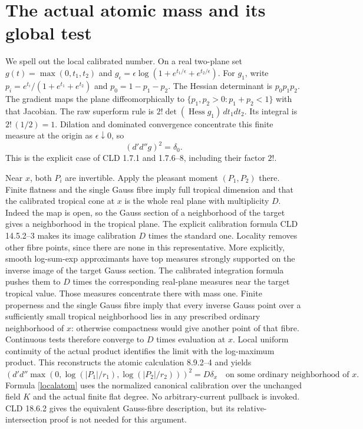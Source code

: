 \documentclass[11pt]{article}
\newcommand{\DD}{d'd''}
\theoremstyle{remark}\newtheorem{remark}[theorem]{Remark}
\begin{document}
\section{The actual atomic mass and its global test}
We spell out the local calibrated number.
On a real two-plane set $g(t)=\max(0,t_1,t_2)$ and
$g_\epsilon=\epsilon\log(1+e^{t_1/\epsilon}+e^{t_2/\epsilon})$.
For $g_1$, write $p_i=e^{t_i}/(1+e^{t_1}+e^{t_2})$ and
$p_0=1-p_1-p_2$. The Hessian determinant is $p_0p_1p_2$.
The gradient maps the plane diffeomorphically to
$\{p_1,p_2>0:p_1+p_2<1\}$ with that Jacobian.
The raw superform rule is $2!\det(\operatorname{Hess}g_1)\,dt_1dt_2$.
Its integral is $2!\,(1/2)=1$.
Dilation and dominated convergence concentrate this finite measure
at the origin as $\epsilon\downarrow0$, so
\[
 (\DD g)^2=\delta_0.
\]
This is the explicit case of CLD 1.7.1 and 1.7.6--8, including
their factor $2!$.

Near $x$, both $P_i$ are invertible. Apply the pleasant moment
$(P_1,P_2)$ there. Finite flatness and the single Gauss fibre imply
full tropical dimension and that the calibrated tropical cone at
$x$ is the whole real plane with multiplicity $D$.
Indeed the map is open, so the Gauss section of a neighborhood of
the target gives a neighborhood in the tropical plane. The explicit
calibration formula CLD 14.5.2--3 makes its image calibration
$D$ times the standard one. Locality removes other fibre points,
since there are none in this representative. More explicitly,
smooth log-sum-exp approximants have top measures strongly
supported on the inverse image of the target Gauss section.
The calibrated integration formula pushes them to $D$ times the
corresponding real-plane measures near the target tropical value.
Those measures concentrate there with mass one. Finite properness
and the single Gauss fibre imply that every inverse Gauss point
over a sufficiently small tropical neighborhood lies in any
prescribed ordinary neighborhood of $x$: otherwise compactness
would give another point of that fibre. Continuous tests therefore
converge to $D$ times evaluation at $x$. Local uniform continuity
of the actual product identifies the limit with the log-maximum
product. This reconstructs the atomic calculation 8.9.2--4 and yields
\begin{equation}\label{localatom}
 \left(\DD\max(0,\log(|P_1|/r_1),\log(|P_2|/r_2))\right)^2
 =D\delta_x
 \quad\text{on some ordinary neighborhood of }x.
\end{equation}
Formula \eqref{localatom} uses the normalized
canonical calibration over the unchanged field $K$ and the actual
finite flat degree. No arbitrary-current pullback is invoked.
CLD 18.6.2 gives the equivalent Gauss-fibre description, but its
relative-intersection proof is not needed for this argument.
\end{document}
